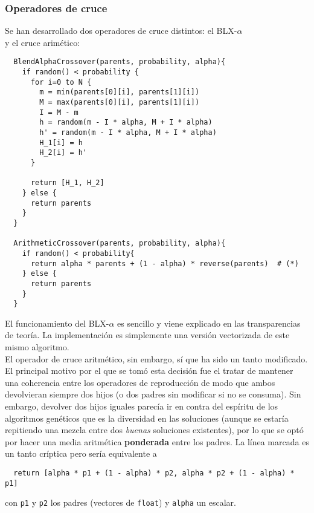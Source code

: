 \documentclass[11pt]{article}
\theoremstyle{plain}
\theoremstyle{definition}
\begin{document}
\subsubsection{Operadores de cruce}

Se han desarrollado dos operadores de cruce distintos: el BLX-$\alpha$ \\
y el cruce arimético:

\begin{lstlisting}
  BlendAlphaCrossover(parents, probability, alpha){
    if random() < probability {
      for i=0 to N {
        m = min(parents[0][i], parents[1][i])
        M = max(parents[0][i], parents[1][i])
        I = M - m
        h = random(m - I * alpha, M + I * alpha)
        h' = random(m - I * alpha, M + I * alpha)
        H_1[i] = h
        H_2[i] = h'
      }

      return [H_1, H_2]
    } else {
      return parents
    }
  }

  ArithmeticCrossover(parents, probability, alpha){
    if random() < probability{
      return alpha * parents + (1 - alpha) * reverse(parents)  # (*)
    } else {
      return parents
    }
  }
\end{lstlisting}

El funcionamiento del BLX-$\alpha$ es sencillo y viene explicado en
las transparencias de teoría. La implementación es simplemente una
versión vectorizada de este mismo algoritmo. \\

El operador de cruce aritmético, sin embargo, sí que ha sido un tanto
modificado. El principal motivo por el que se tomó esta decisión fue
el tratar de mantener una coherencia entre los operadores de
reproducción de modo que ambos devolvieran siempre dos hijos (o dos
padres sin modificar si no se consuma). Sin embargo, devolver dos
hijos iguales parecía ir en contra del espíritu de los algoritmos
genéticos que es la diversidad en las soluciones (aunque se estaría
repitiendo una mezcla entre dos \textit{buenas} soluciones
existentes), por lo que se optó por hacer una media aritmética
\textbf{ponderada} entre los padres. La línea marcada es un tanto
críptica pero sería equivalente a

\begin{lstlisting}
  return [alpha * p1 + (1 - alpha) * p2, alpha * p2 + (1 - alpha) * p1]
\end{lstlisting}

con \texttt{p1} y \texttt{p2} los padres (vectores de \texttt{float}) y \texttt{alpha} un escalar. \\
\end{document}
